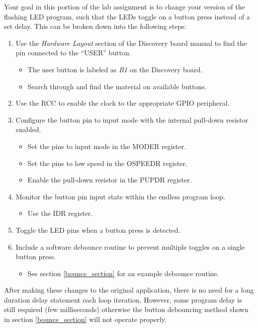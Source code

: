 \documentclass[11pt,fleqn]{book} %
\begin{document}
Your goal in this portion of the lab assignment is to change your version of the flashing LED program, such that the LEDs toggle on a button press instead of a set delay. This can be broken down into the following steps:

\begin{enumerate}
    \item Use the \textit{Hardware Layout} section of the Discovery board manual to find the pin connected to the ``USER'' button.
    \begin{itemize}
        \item The user button is labeled as \textit{B1} on the Discovery board.
        \item Search through and find the material on available buttons. 
    \end{itemize}
    \item Use the RCC to enable the clock to the appropriate GPIO peripheral.
    \item Configure the button pin to input mode with the internal pull-down resistor enabled.
    \begin{itemize}
        \item Set the pins to input mode in the MODER register. 
        \item Set the pins to low speed in the OSPEEDR register. 
        \item Enable the pull-down resistor in the PUPDR register. 
    \end{itemize}
    \item Monitor the button pin input state within the endless program loop.
    \begin{itemize}
        \item Use the IDR register.  
    \end{itemize}
    \item Toggle the LED pins when a button press is detected.
    \item Include a software debounce routine to prevent multiple toggles on a single button press.
    \begin{itemize}
        \item See section \vref{bounce_section} for an example debounce routine. 
    \end{itemize}
\end{enumerate}

After making these changes to the original application, there is no need for a long duration delay statement each loop iteration. However, some program delay is still required (few milliseconds) otherwise the button debouncing method shown in section \vref{bounce_section} will not operate properly. 
\end{document}
